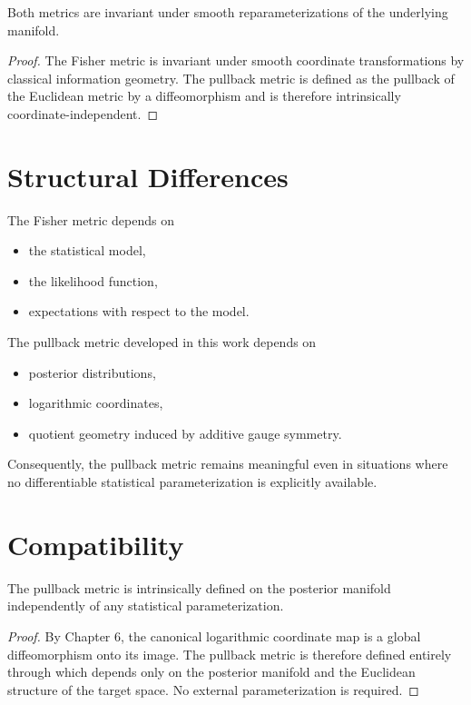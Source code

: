 \begin{proposition}
\label{ch:prop:10-2}
Both metrics are invariant under smooth reparameterizations of the
underlying manifold.
\end{proposition}
\begin{proof}
The Fisher metric is invariant under smooth coordinate transformations
by classical information geometry.
The pullback metric is defined as the pullback of the Euclidean metric
by a diffeomorphism and is therefore intrinsically
coordinate-independent. 
\end{proof}
\section{Structural Differences}
The Fisher metric depends on
\begin{itemize}
\item the statistical model,
\item the likelihood function,
\item expectations with respect to the model.
\end{itemize}
The pullback metric developed in this work depends on
\begin{itemize}
\item posterior distributions,
\item logarithmic coordinates,
\item quotient geometry induced by additive gauge symmetry.
\end{itemize}
Consequently, the pullback metric remains meaningful even in situations
where no differentiable statistical parameterization is explicitly
available.
\section{Compatibility}
\begin{theorem}
\label{ch:thm:10-3}
The pullback metric is intrinsically defined on the posterior manifold
independently of any statistical parameterization.
\end{theorem}
\begin{proof}
By Chapter 6, the canonical logarithmic coordinate map
is a global diffeomorphism onto its image.
The pullback metric is therefore defined entirely through
which depends only on the posterior manifold and the Euclidean structure
of the target space.
No external parameterization is required. 
\end{proof}

